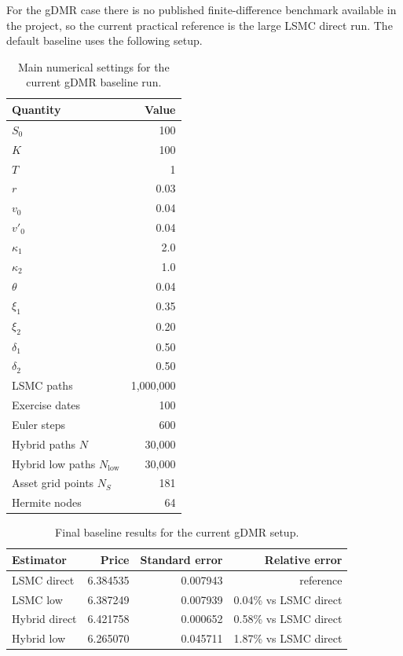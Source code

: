 \documentclass[11pt]{article}
\begin{document}
For the gDMR case there is no published finite-difference benchmark available in the project, so the
current practical reference is the large LSMC direct run. The default baseline uses the following setup.

\begin{table}[h]
\centering
\caption{Main numerical settings for the current gDMR baseline run.}
\begin{tabular}{lr}
\toprule
Quantity & Value \\
\midrule
$S_0$ & 100 \\
$K$ & 100 \\
$T$ & 1 \\
$r$ & 0.03 \\
$v_0$ & 0.04 \\
$v'_0$ & 0.04 \\
$\kappa_1$ & 2.0 \\
$\kappa_2$ & 1.0 \\
$\theta$ & 0.04 \\
$\xi_1$ & 0.35 \\
$\xi_2$ & 0.20 \\
$\delta_1$ & 0.50 \\
$\delta_2$ & 0.50 \\
LSMC paths & 1,000,000 \\
Exercise dates & 100 \\
Euler steps & 600 \\
Hybrid paths $N$ & 30,000 \\
Hybrid low paths $N_{\mathrm{low}}$ & 30,000 \\
Asset grid points $N_S$ & 181 \\
Hermite nodes & 64 \\
\bottomrule
\end{tabular}
\end{table}

\begin{table}[h]
\centering
\caption{Final baseline results for the current gDMR setup.}
\begin{tabular}{lrrr}
\toprule
Estimator & Price & Standard error & Relative error \\
\midrule
LSMC direct   & 6.384535 & 0.007943 & reference \\
LSMC low      & 6.387249 & 0.007939 & 0.04\% vs LSMC direct \\
Hybrid direct & 6.421758 & 0.000652 & 0.58\% vs LSMC direct \\
Hybrid low    & 6.265070 & 0.045711 & 1.87\% vs LSMC direct \\
\bottomrule
\end{tabular}
\end{table}
\end{document}
